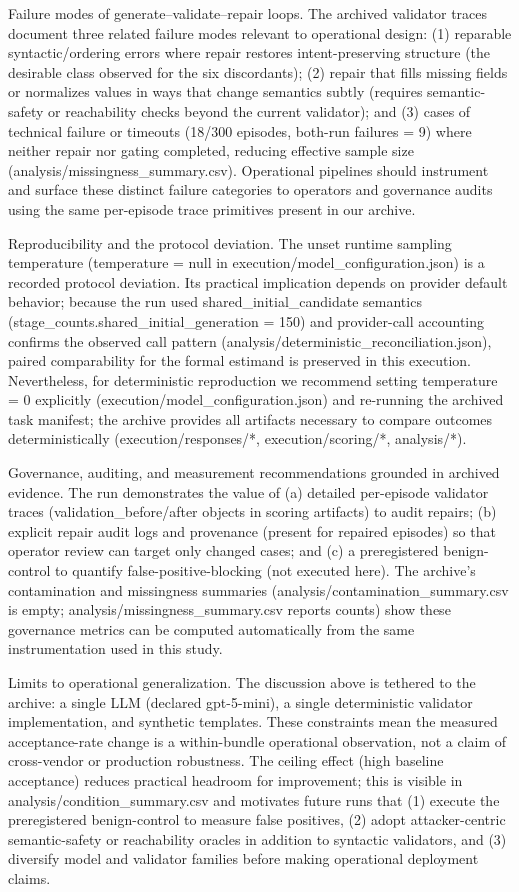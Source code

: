 \documentclass[conference]{IEEEtran}
\begin{document}
Failure modes of generate--validate--repair loops. The archived validator traces document three related failure modes relevant to operational design: (1) reparable syntactic/ordering errors where repair restores intent-preserving structure (the desirable class observed for the six discordants); (2) repair that fills missing fields or normalizes values in ways that change semantics subtly (requires semantic-safety or reachability checks beyond the current validator); and (3) cases of technical failure or timeouts (18/300 episodes, both-run failures = 9) where neither repair nor gating completed, reducing effective sample size (analysis/missingness\_summary.csv). Operational pipelines should instrument and surface these distinct failure categories to operators and governance audits using the same per-episode trace primitives present in our archive.

Reproducibility and the protocol deviation. The unset runtime sampling temperature (temperature = null in execution/model\_configuration.json) is a recorded protocol deviation. Its practical implication depends on provider default behavior; because the run used shared\_initial\_candidate semantics (stage\_counts.shared\_initial\_generation = 150) and provider-call accounting confirms the observed call pattern (analysis/deterministic\_reconciliation.json), paired comparability for the formal estimand is preserved in this execution. Nevertheless, for deterministic reproduction we recommend setting temperature = 0 explicitly (execution/model\_configuration.json) and re-running the archived task manifest; the archive provides all artifacts necessary to compare outcomes deterministically (execution/responses/*, execution/scoring/*, analysis/*).

Governance, auditing, and measurement recommendations grounded in archived evidence. The run demonstrates the value of (a) detailed per-episode validator traces (validation\_before/after objects in scoring artifacts) to audit repairs; (b) explicit repair audit logs and provenance (present for repaired episodes) so that operator review can target only changed cases; and (c) a preregistered benign-control to quantify false-positive-blocking (not executed here). The archive's contamination and missingness summaries (analysis/contamination\_summary.csv is empty; analysis/missingness\_summary.csv reports counts) show these governance metrics can be computed automatically from the same instrumentation used in this study.

Limits to operational generalization. The discussion above is tethered to the archive: a single LLM (declared gpt-5-mini), a single deterministic validator implementation, and synthetic templates. These constraints mean the measured acceptance-rate change is a within-bundle operational observation, not a claim of cross-vendor or production robustness. The ceiling effect (high baseline acceptance) reduces practical headroom for improvement; this is visible in analysis/condition\_summary.csv and motivates future runs that (1) execute the preregistered benign-control to measure false positives, (2) adopt attacker-centric semantic-safety or reachability oracles in addition to syntactic validators, and (3) diversify model and validator families before making operational deployment claims.
\end{document}
